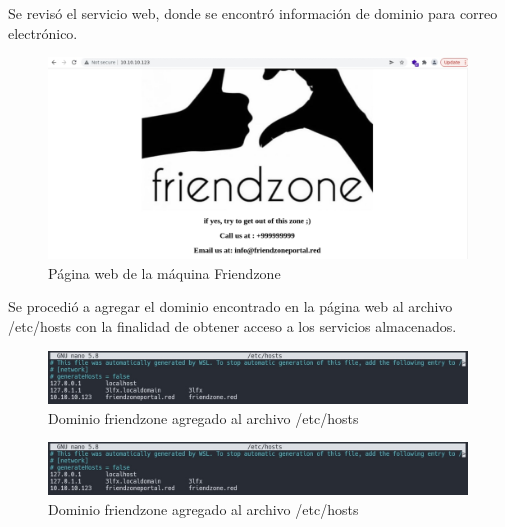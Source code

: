         \large{Se revisó el servicio web, donde se encontró información de dominio para correo electrónico.}
        \begin{figure}[H]
            \centering
            \includegraphics[width=0.99\textwidth]{informe4/imagenes/friendzone/06_web.png}
            \caption{Página web de la máquina Friendzone} 
        \end{figure}

        \large{Se procedió a agregar el dominio encontrado en la página web al archivo /etc/hosts con la finalidad de obtener acceso a los servicios almacenados.}
        \begin{figure}[H]
            \centering
            \includegraphics[width=0.99\textwidth]{informe4/imagenes/friendzone/07_etchosts.png}
            \caption{Dominio friendzone agregado al archivo /etc/hosts} 
        \end{figure}

        \large{}
        \begin{figure}[H]
            \centering
            \includegraphics[width=0.99\textwidth]{informe4/imagenes/friendzone/07_etchosts.png}
            \caption{Dominio friendzone agregado al archivo /etc/hosts} 
        \end{figure}

